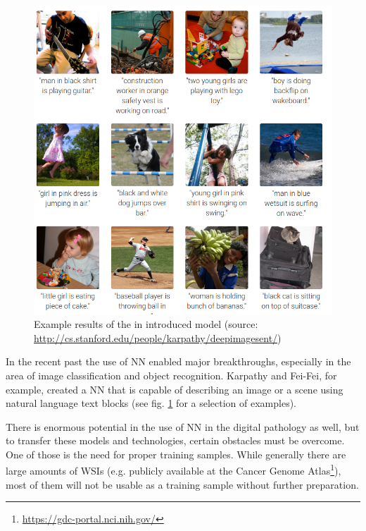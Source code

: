 \begin{figure}[ht]
	\begin{center}
		\includegraphics[scale=0.3]{img/deepVisual.png}
		\caption{Example results of the in \cite{Karpathy15} introduced model (source: \url{http://cs.stanford.edu/people/karpathy/deepimagesent/})}
		\label{fig1_karpathy}
	\end{center}
\end{figure}

In the recent past the use of NN enabled major breakthroughs, especially in the area of image classification and object recognition. Karpathy and Fei-Fei, for example, created a NN that is capable of describing an image or a scene using natural language text blocks \cite{Karpathy15} (see fig. \ref{fig1_karpathy} for a selection of examples).

There is enormous potential in the use of NN in the digital pathology as well, but to transfer these models and technologies, certain obstacles must be overcome. One of those is the need for proper training samples. While generally there are large amounts of WSIs (e.g. publicly available at the Cancer Genome Atlas\footnote{\url{https://gdc-portal.nci.nih.gov/}}), most of them will not be usable as a training sample without further preparation.


